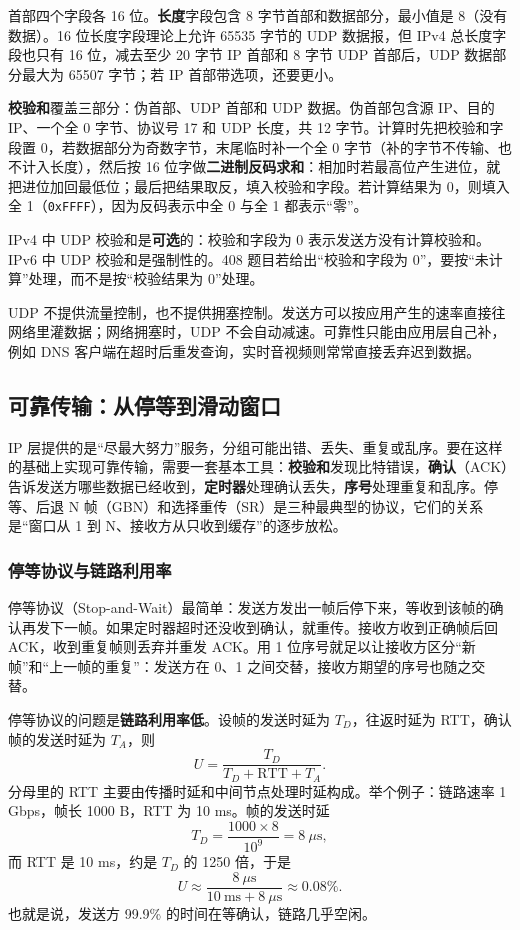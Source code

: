 首部四个字段各 16 位。\textbf{长度}字段包含 8 字节首部和数据部分，最小值是 8（没有数据）。16 位长度字段理论上允许 65535 字节的 UDP 数据报，但 IPv4 总长度字段也只有 16 位，减去至少 20 字节 IP 首部和 8 字节 UDP 首部后，UDP 数据部分最大为 65507 字节；若 IP 首部带选项，还要更小。

\textbf{校验和}覆盖三部分：伪首部、UDP 首部和 UDP 数据。伪首部包含源 IP、目的 IP、一个全 0 字节、协议号 17 和 UDP 长度，共 12 字节。计算时先把校验和字段置 0，若数据部分为奇数字节，末尾临时补一个全 0 字节（补的字节不传输、也不计入长度），然后按 16 位字做\textbf{二进制反码求和}：相加时若最高位产生进位，就把进位加回最低位；最后把结果取反，填入校验和字段。若计算结果为 0，则填入全 1（\texttt{0xFFFF}），因为反码表示中全 0 与全 1 都表示“零”。

IPv4 中 UDP 校验和是\textbf{可选}的：校验和字段为 0 表示发送方没有计算校验和。IPv6 中 UDP 校验和是强制性的。408 题目若给出“校验和字段为 0”，要按“未计算”处理，而不是按“校验结果为 0”处理。

UDP 不提供流量控制，也不提供拥塞控制。发送方可以按应用产生的速率直接往网络里灌数据；网络拥塞时，UDP 不会自动减速。可靠性只能由应用层自己补，例如 DNS 客户端在超时后重发查询，实时音视频则常常直接丢弃迟到数据。

\subsection{可靠传输：从停等到滑动窗口}

IP 层提供的是“尽最大努力”服务，分组可能出错、丢失、重复或乱序。要在这样的基础上实现可靠传输，需要一套基本工具：\textbf{校验和}发现比特错误，\textbf{确认}（ACK）告诉发送方哪些数据已经收到，\textbf{定时器}处理确认丢失，\textbf{序号}处理重复和乱序。停等、后退 N 帧（GBN）和选择重传（SR）是三种最典型的协议，它们的关系是“窗口从 1 到 N、接收方从只收到缓存”的逐步放松。

\subsubsection{停等协议与链路利用率}

停等协议（Stop-and-Wait）最简单：发送方发出一帧后停下来，等收到该帧的确认再发下一帧。如果定时器超时还没收到确认，就重传。接收方收到正确帧后回 ACK，收到重复帧则丢弃并重发 ACK。用 1 位序号就足以让接收方区分“新帧”和“上一帧的重复”：发送方在 0、1 之间交替，接收方期望的序号也随之交替。

停等协议的问题是\textbf{链路利用率低}。设帧的发送时延为 $T_D$，往返时延为 RTT，确认帧的发送时延为 $T_A$，则
\[
U=\frac{T_D}{T_D+\mathrm{RTT}+T_A}.
\]
分母里的 RTT 主要由传播时延和中间节点处理时延构成。举个例子：链路速率 1 Gbps，帧长 1000 B，RTT 为 10 ms。帧的发送时延
\[
T_D=\frac{1000\times 8}{10^9}=8\ \mu\mathrm{s},
\]
而 RTT 是 10 ms，约是 $T_D$ 的 1250 倍，于是
\[
U\approx\frac{8\ \mu\mathrm{s}}{10\ \mathrm{ms}+8\ \mu\mathrm{s}}\approx 0.08\%.
\]
也就是说，发送方 99.9\% 的时间在等确认，链路几乎空闲。

